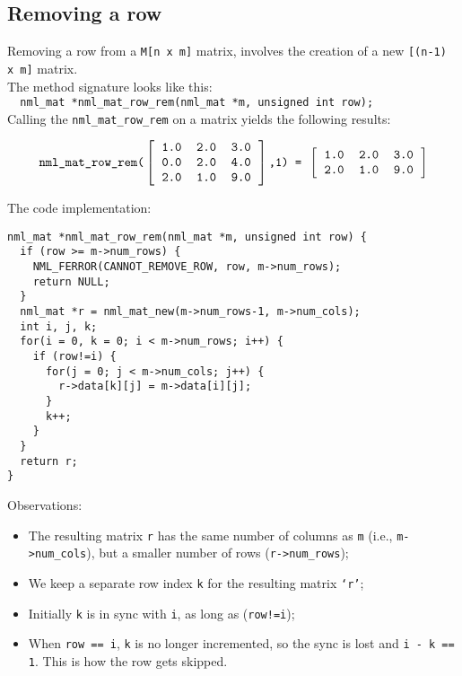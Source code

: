 \subsection{Removing a row}

Removing a row from a {\tt M[n x m]} matrix, involves the creation of a new {\tt [(n-1) x m]} matrix.
\\

The method signature looks like this:
\\

\texttt{
 \ nml\_mat *nml\_mat\_row\_rem(nml\_mat *m, unsigned int row);
 }
\\

Calling the {\tt nml\_mat\_row\_rem} on a matrix yields the following results:

$$
\texttt{nml\_mat\_row\_rem(}
\left[ \begin{tabular}{rrr}
\tt 1.0 & \tt 2.0 & \tt 3.0 \\
\tt 0.0 & \tt 2.0 & \tt 4.0 \\
\tt 2.0 & \tt 1.0 & \tt 9.0
\end{tabular} \right]
\texttt{,1) = }
\left[ \begin{tabular}{rrr}
\tt 1.0 & \tt 2.0 & \tt 3.0 \\
\tt 2.0 & \tt 1.0 & \tt 9.0
\end{tabular} \right]
$$

The code implementation:

\begin{verbatim}
nml_mat *nml_mat_row_rem(nml_mat *m, unsigned int row) {
  if (row >= m->num_rows) {
    NML_FERROR(CANNOT_REMOVE_ROW, row, m->num_rows);
    return NULL;
  }
  nml_mat *r = nml_mat_new(m->num_rows-1, m->num_cols);
  int i, j, k;
  for(i = 0, k = 0; i < m->num_rows; i++) {
    if (row!=i) {
      for(j = 0; j < m->num_cols; j++) {
        r->data[k][j] = m->data[i][j];
      }
      k++;
    }
  }
  return r;
}
\end{verbatim}

Observations:

\begin{itemize}
\item The resulting matrix {\tt r} has the same number of columns as {\tt m} (i.e., {\tt m->num\_cols}), but a smaller number of rows ({\tt r->num\_rows});
\item We keep a separate row index {\tt k} for the resulting matrix {\tt ‘r’};
\item Initially {\tt k} is in sync with {\tt i}, as long as ({\tt row!=i});
\item When {\tt row == i}, {\tt k} is no longer incremented, so the sync is lost and {\tt i - k == 1}. This is how the row gets skipped.
\end{itemize}

